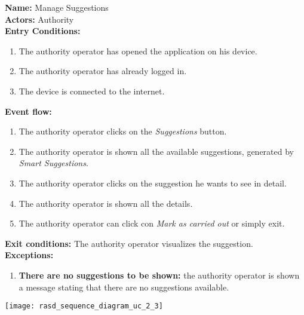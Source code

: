 \begin{usecase}{2.3}
    \textbf{Name:} Manage Suggestions \\
    \textbf{Actors:} Authority \\
    \textbf{Entry Conditions:}
    \begin{enumerate}
        \item The authority operator has opened the application on his device.
        \item The authority operator has already logged in.
        \item The device is connected to the internet.
    \end{enumerate}
    \textbf{Event flow:}
    \begin{enumerate}
        \item The authority operator clicks on the \emph{Suggestions} button.
        \item The authority operator is shown all the available suggestions,
        generated by \emph{Smart Suggestions}.
        \item The authority operator clicks on the suggestion he wants to see in
        detail.
        \item The authority operator is shown all the details.
        \item The authority operator can click con \emph{Mark as carried out} or
        simply exit.
    \end{enumerate}
    \textbf{Exit conditions:} The authority operator visualizes the suggestion.
    \\
    \textbf{Exceptions:}
    \begin{enumerate}
        \item \textbf{There are no suggestions to be shown:} the authority
        operator is shown a message stating that there are no suggestions
        available.
    \end{enumerate}
    \tcblower
    \centering
    \texttt{[image: rasd\_sequence\_diagram\_uc\_2\_3]}
\end{usecase}